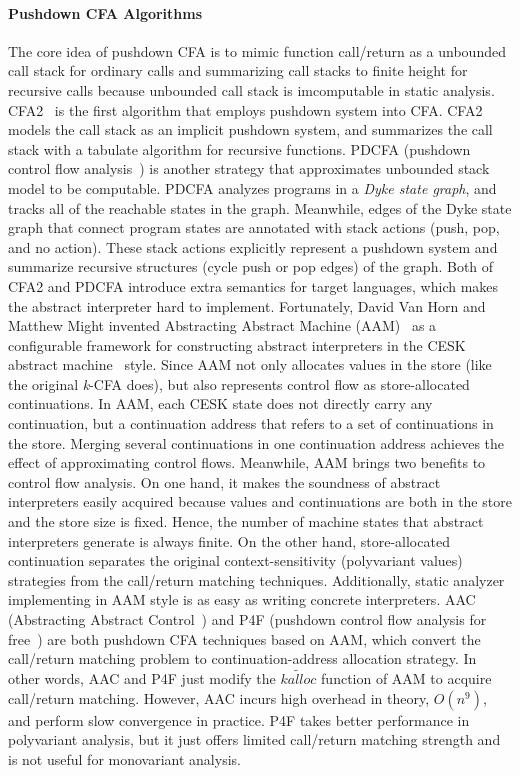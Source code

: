 \documentclass{article}
\begin{document}
\paragraph{Pushdown CFA Algorithms}
The core idea of pushdown CFA is to mimic function call/return as a unbounded call stack for ordinary calls and summarizing call stacks to finite height for recursive calls because unbounded call stack is imcomputable in static analysis.
CFA2~\cite{vardoulakis2010cfa2} is the first algorithm that employs pushdown system into CFA\@.
CFA2 models the call stack as an implicit pushdown system, and summarizes the call stack with a tabulate algorithm for recursive functions.
PDCFA (pushdown control flow analysis~\cite{earl2010pushdown})
is another strategy that approximates unbounded stack model to be computable.
PDCFA analyzes programs in a \emph{Dyke state graph}, and tracks all of the reachable states in the graph.
Meanwhile, edges of the Dyke state graph that connect program states are annotated with stack actions (push, pop, and no action).
These stack actions explicitly represent a pushdown system and summarize recursive structures (cycle push or pop edges) of the graph.
Both of CFA2 and PDCFA introduce extra semantics for target languages, which makes the abstract interpreter hard to implement.
Fortunately, David Van Horn and Matthew Might
invented Abstracting Abstract Machine (AAM)~\cite{van2010abstracting}
as a configurable framework for constructing abstract interpreters in the CESK abstract machine~\cite{felleisen1987calculus} style.
Since AAM not only allocates values in the store (like the original \textit{k}-CFA does), but also represents control flow as store-allocated continuations.
In AAM, each CESK state does not directly carry any continuation, but a continuation address that refers to a set of continuations in the store.
Merging several continuations in one continuation address achieves the effect of approximating control flows.
Meanwhile, AAM brings two benefits to control flow analysis.
On one hand, it makes the soundness of abstract interpreters easily acquired because values and continuations are both in the store and
the store size is fixed.
Hence, the number of machine states that abstract interpreters generate is always finite.
On the other hand, store-allocated continuation separates the original context-sensitivity (polyvariant values) strategies from
the call/return matching techniques.
Additionally, static analyzer implementing in AAM style is as easy as writing concrete interpreters.
AAC (Abstracting Abstract Control~\cite{johnson2015abstracting}) and P4F (pushdown control flow analysis for free~\cite{gilray2016pushdown})
are both pushdown CFA techniques based on AAM\@, which convert the call/return matching problem to continuation-address allocation strategy.
In other words, AAC and P4F just modify the $\widetilde{kalloc}$ function of AAM to acquire call/return matching.
However, AAC incurs high overhead in theory, $O(n^9)$, and perform slow convergence in practice. %
P4F takes better performance in polyvariant analysis, but it just offers limited call/return matching strength and is not useful for monovariant analysis.
\end{document}
